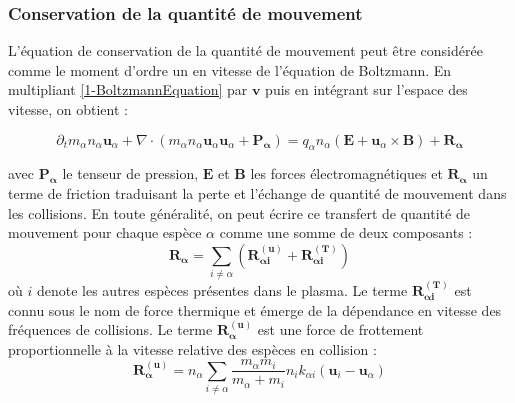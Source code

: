 \begin{refsection}
\subsubsection{Conservation de la quantité de mouvement}
L'équation de conservation de la quantité de mouvement peut être considérée
comme le moment d'ordre un en vitesse de l'équation de Boltzmann. En multipliant
\eqref{1-BoltzmannEquation} par $\mathbf v$ puis en intégrant sur l'espace des
vitesse, on obtient :

\begin{equation}
\label{1-eqQuantiteMouvement}
\partial_t m_\alpha n_\alpha \mathbf{u}_\alpha + 
\nabla\cdot\left(m_\alpha n_\alpha
\mathbf{u}_\alpha\mathbf{u}_\alpha+\mathbf{P_\alpha}\right)=q_\alpha
n_\alpha\left(\mathbf E+\mathbf u_\alpha\times\mathbf B\right)
+\mathbf{R_\alpha}
\end{equation}

avec $\mathbf{P_\alpha}$ le tenseur de pression, $\mathbf{E}$ et $\mathbf{B}$
les forces électromagnétiques et $\mathbf{R_\alpha}$ un terme de
friction traduisant la perte et l'échange de quantité de mouvement dans les
collisions. En toute généralité, on peut écrire ce transfert de quantité de
mouvement pour chaque espèce $\alpha$ comme une somme de deux composants :
\begin{equation}
\mathbf{R_\alpha}=\sum_{i\neq\alpha}(\mathbf{R_{\alpha i}^{(\mathbf
u)}}+\mathbf{R_{\alpha i}^{(T)}})
\end{equation}
où $i$ denote les autres espèces présentes dans le plasma. Le terme
$\mathbf{R_{\alpha i}^{(T)}}$ est connu sous le nom de force thermique et émerge
de la dépendance en vitesse des fréquences de collisions. Le terme $\mathbf{R_{\alpha}^{(\mathbf
u)}}$ est une force de frottement proportionnelle à la vitesse relative des espèces en collision
:
\begin{equation}
\mathbf{R_{\alpha}^{(\mathbf
u)}}=n_\alpha\sum_{i\neq\alpha}\frac{m_\alpha m_i}{m_\alpha+m_i}
n_ik_{\alpha i} \left(\mathbf u_i-\mathbf u_\alpha\right)
\end{equation}


\end{refsection}

